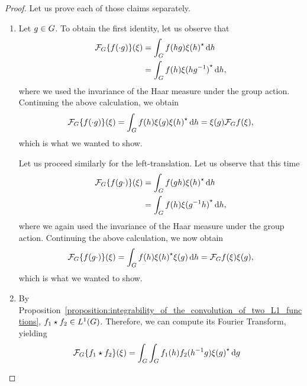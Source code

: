 \begin{proof}
    Let us prove each of those claims separately.

    \begin{enumerate}
        \item
            Let $g \in G$.
            To obtain the first identity,
            let us observe that
            \begin{align*}
                \mathcal{F}_{G} \{f(\cdot g)\}(\xi)
                &= \int_G f(h g) {\xi(h)}^\star \,\mathrm{d} h\\
                &= \int_G f(h) {\xi(h g^{-1})}^\star \,\mathrm{d} h,
            \end{align*}
            where we used the invariance of the Haar measure under the group action.
            Continuing the above calculation,
            we obtain
            \begin{align*}
                \mathcal{F}_{G} \{f(\cdot g)\}(\xi)
                = \int_G f(h) \xi(g) {\xi(h)}^\star \,\mathrm{d} h
                = \xi(g) \mathcal{F}_{G} f(\xi),
            \end{align*}
            which is what we wanted to show.

            Let us proceed similarly for the left-translation.
            Let us observe that this time
            \begin{align*}
                \mathcal{F}_{G} \{f(g \cdot)\}(\xi)
                &= \int_G f(g h) {\xi(h)}^\star \,\mathrm{d} h\\
                &= \int_G f(h) {\xi(g^{-1} h)}^\star \,\mathrm{d} h,
            \end{align*}
            where we again used the invariance of the Haar measure under the group action.
            Continuing the above calculation,
            we now obtain
            \begin{align*}
                \mathcal{F}_{G} \{f(g \cdot)\}(\xi)
                = \int_G f(h) {\xi(h)}^\star \xi(g) \,\mathrm{d} h
                = \mathcal{F}_{G} f(\xi) \xi(g),
            \end{align*}
            which is what we wanted to show.
        \item
            By Proposition~\ref{proposition:integrability_of_the_convolution_of_two_L1_functions},
            $f_1 \star f_2 \in {L^{1} (G)}$.
            Therefore,
            we can compute its Fourier Transform,
            yielding
            \begin{align*}
                \mathcal{F}_{G} \{f_1 \star f_2\}(\xi)
                &= \int_G \int_G f_1(h) f_2(h^{-1} g) {\xi(g)}^\star \,\mathrm{d} g
            \end{align*}


\end{enumerate}
\end{proof}
